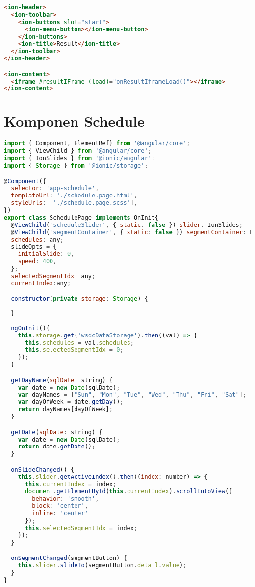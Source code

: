 \begin{lstlisting}[language=html, label={lst:result.page.html}, caption=result.page.html]
<ion-header>
  <ion-toolbar>
    <ion-buttons slot="start">
      <ion-menu-button></ion-menu-button>
    </ion-buttons>
    <ion-title>Result</ion-title>
  </ion-toolbar>
</ion-header>

<ion-content>
  <iframe #resultIFrame (load)="onResultIframeLoad()"></iframe>
</ion-content>

\end{lstlisting}

\section{Komponen Schedule} 
\label{sec:lampiranKomponenSchedule}

\begin{lstlisting}[language=JavaScript, label={lst:schedule.page.ts}, caption=schedule.page.ts]
import { Component, ElementRef} from '@angular/core';
import { ViewChild } from '@angular/core';
import { IonSlides } from '@ionic/angular';
import { Storage } from '@ionic/storage';

@Component({
  selector: 'app-schedule',
  templateUrl: './schedule.page.html',
  styleUrls: ['./schedule.page.scss'],
})
export class SchedulePage implements OnInit{
  @ViewChild('scheduleSlider', { static: false }) slider: IonSlides;
  @ViewChild('segmentContainer', { static: false }) segmentContainer: ElementRef;
  schedules: any;
  slideOpts = {
    initialSlide: 0,
    speed: 400,
  };
  selectedSegmentIdx: any;
  currentIndex:any;

  constructor(private storage: Storage) {
  
  }
  
  ngOnInit(){
    this.storage.get('wsdcDataStorage').then((val) => {
      this.schedules = val.schedules;
      this.selectedSegmentIdx = 0;
    });
  }

  getDayName(sqlDate: string) {
    var date = new Date(sqlDate);
    var dayNames = ["Sun", "Mon", "Tue", "Wed", "Thu", "Fri", "Sat"];
    var dayOfWeek = date.getDay();
    return dayNames[dayOfWeek];
  }

  getDate(sqlDate: string) {
    var date = new Date(sqlDate);
    return date.getDate();
  }

  onSlideChanged() {
    this.slider.getActiveIndex().then((index: number) => {
      this.currentIndex = index;
      document.getElementById(this.currentIndex).scrollIntoView({
        behavior: 'smooth',
        block: 'center',
        inline: 'center'
      });
      this.selectedSegmentIdx = index;
    });
  }

  onSegmentChanged(segmentButton) {
    this.slider.slideTo(segmentButton.detail.value);
  }
}

\end{lstlisting} 

